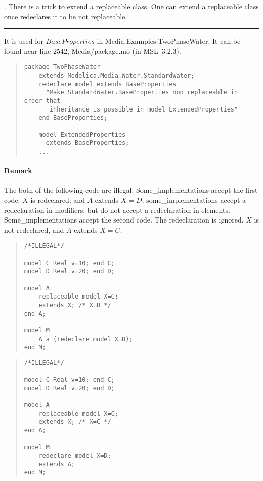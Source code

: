 \documentclass[10pt,b5paper]{article}
\newcounter{ruleno}
\def\tombstone{\rule[-.2ex]{.3em}{1.8ex}}
\newenvironment{widequote}{%
\list{}{\leftmargin=0mm\rightmargin=\leftmargin}%
\item\relax}{\endlist}
\def\factlead{\refstepcounter{ruleno}{\bf{}Fact~\arabic{ruleno}}.}
\newenvironment{QFACT}{\begin{widequote}\factlead}%
{\unskip\nobreakspace\tombstone\end{widequote}\ignorespacesafterend}
\begin{document}
\begin{QFACT} There is a trick to extend a replaceable class.  One can
extend a replaceable class once redeclares it to be not
replaceable.\end{QFACT}
It is used for $\mathit{BaseProperties}$ in
Media.Examples.TwoPhaseWater.  It can be found near line 2542,
Media/package.mo (in MSL~3.2.3).

\begin{quote}
\begin{lstlisting}[aboveskip=-\baselineskip]
  package TwoPhaseWater
    extends Modelica.Media.Water.StandardWater;
    redeclare model extends BaseProperties
      "Make StandardWater.BaseProperties non replaceable in order that
       inheritance is possible in model ExtendedProperties"
    end BaseProperties;

    model ExtendedProperties
      extends BaseProperties;
    ...
\end{lstlisting}
\end{quote}

\paragraph {Remark}

The both of the following code are illegal.  Some_implementations
accept the first code.  $X$ is redeclared, and $A$ extends $X=D$.
some_implementations accept a redeclaration in modifiers, but do not
accept a redeclaration in elements.  Some_implementations accept the
second code.  The redeclaration is ignored.  $X$ is not redeclared,
and $A$ extends $X=C$.

\begin{quote}
\begin{lstlisting}[aboveskip=-\baselineskip]
/*ILLEGAL*/

model C Real v=10; end C;
model D Real v=20; end D;

model A
    replaceable model X=C;
    extends X; /* X=D */
end A;

model M
    A a (redeclare model X=D);
end M;
\end{lstlisting}
\end{quote}

\begin{quote}
\begin{lstlisting}[aboveskip=-\baselineskip]
/*ILLEGAL*/

model C Real v=10; end C;
model D Real v=20; end D;

model A
    replaceable model X=C;
    extends X; /* X=C */
end A;

model M
    redeclare model X=D;
    extends A;
end M;
\end{lstlisting}
\end{quote}
\end{document}
